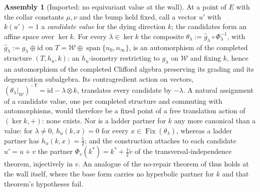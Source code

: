 \documentclass[11pt]{article}
\theoremstyle{definition}
\newtheorem{assembled}[theorem]{Assembly}
\theoremstyle{plain}
\providecommand{\id}{}\renewcommand{\id}{\mathrm{id}}
\providecommand{\nInf}{}\renewcommand{\nInf}{n_\infty}
\providecommand{\nO}{}\renewcommand{\nO}{n_0}
\providecommand{\shW}{}\renewcommand{\shW}{\mathcal{W}}
\begin{document}
\begin{assembled}[Imported: no equivariant value at the wall]\label{c:singularity.imported-no-equivariant-value-wall}
At a point of $E$ with the collar constants $\mu, \nu$ and the bump held fixed, call a vector $u'$ with $k(u') = 1$ a \emph{candidate value} for the dying direction $k$; the candidates form an affine space over $\ker k$. For every $\lambda \in \ker k$ the composite $\theta_\lambda := \hat g_\lambda \circ \Phi_\lambda^{-1}$, with $\hat g_\lambda := g_\lambda \oplus \id$ on $T = \shW \oplus \operatorname{span}\{\nO, \nInf\}$, is an automorphism of the completed structure $(T, h_u, k)$: an $h_u$-isometry restricting to $g_\lambda$ on $\shW$ and fixing $k$, hence an automorphism of the completed Clifford algebra preserving its grading and its degeneration subalgebra. Its contragredient action on vectors, $(\theta_\lambda|_{\shW})^{-\mathsf{T}} = \id - \lambda \otimes k$, translates every candidate by $-\lambda$. A natural assignment of a candidate value, one per completed structure and commuting with automorphisms, would therefore be a fixed point of a free translation action of $(\ker k, +)$: none exists. Nor is a ladder partner for $k$ any more canonical than a value: for $\lambda \neq 0$, $h_u(k, x) = 0$ for every $x \in \operatorname{Fix}(\theta_\lambda)$, whereas a ladder partner has $h_u(k, x) = \tfrac12$; and the construction attaches to each candidate $u' = u + v$ the partner $\Phi_v(k^*) = k^* + \tfrac12\tilde v$ of the transversal-independence theorem, injectively in $v$. An analogue of the no-repair theorem of \cite[Thm.~4.2]{ButlerT1} thus holds at the wall itself, where the base form carries no hyperbolic partner for $k$ and that theorem's hypotheses fail.

\end{assembled}
\end{document}
